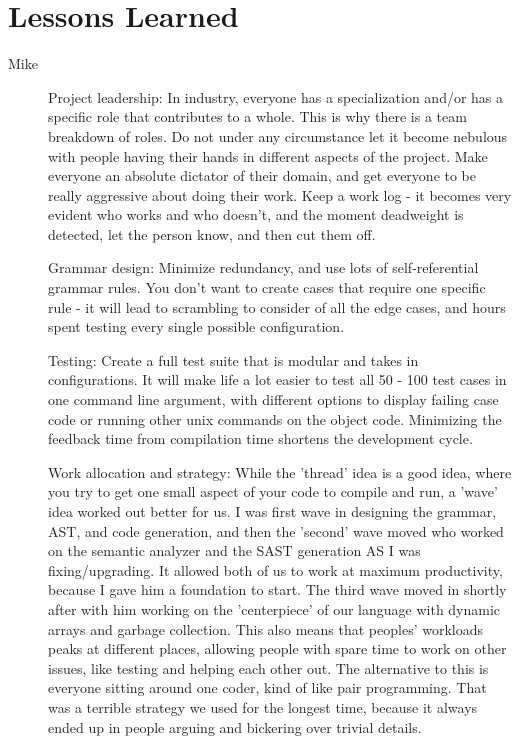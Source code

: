 \documentclass[a4paper]{article}
\begin{document}
\section{Lessons Learned}
\begin{description}
\item[Mike]
\par Project leadership: In industry, everyone has a specialization and/or has a specific role that contributes to a whole. This is why there is a team breakdown of roles. Do not under any circumstance let it become nebulous with people having their hands in different aspects of the project. Make everyone an absolute dictator of their domain, and get everyone to be really aggressive about doing their work. Keep a work log - it becomes very evident who works and who doesn't, and the moment deadweight is detected, let the person know, and then cut them off.

\par Grammar design: Minimize redundancy, and use lots of self-referential grammar rules. You don't want to create cases that require one specific rule - it will lead to scrambling to consider of all the edge cases, and hours spent testing every single possible configuration.

\par Testing: Create a full test suite that is modular and takes in configurations. It will make life a lot easier to test all 50 - 100 test cases in one command line argument, with different options to display failing case code or running other unix commands on the object code. Minimizing the feedback time from compilation time shortens the development cycle.

\par Work allocation and strategy: While the 'thread' idea is a good idea, where you try to get one small aspect of your code to compile and run, a 'wave' idea worked out better for us. I was first wave in designing the grammar, AST, and code generation, and then the 'second' wave moved who worked on the semantic analyzer and the SAST generation AS I was fixing/upgrading. It allowed both of us to work at maximum productivity, because I gave him a foundation to start. The third wave moved in shortly after with him working on the 'centerpiece' of our language with dynamic arrays and garbage collection. This also means that peoples' workloads peaks at different places, allowing people with spare time to work on other issues, like testing and helping each other out. The alternative to this is everyone sitting around one coder, kind of like pair programming. That was a terrible strategy we used for the longest time, because it always ended up in people arguing and bickering over trivial details.


\end{description}
\end{document}
